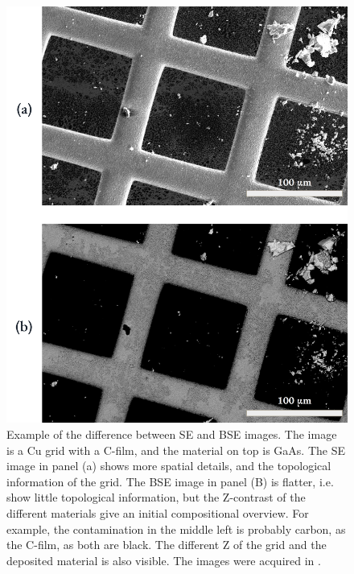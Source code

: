 




\begin{figure}[p]
    \centering
    \includegraphics[width=0.9\linewidth]{figures/SE_images/SE_vs_BSE.jpg}
    \caption{
        Example of the difference between SE and BSE images.
        The image is a Cu grid with a C-film, and the material on top is GaAs.
        The SE image in panel (a) shows more spatial details, and the topological information of the grid.
        The BSE image in panel (B) is flatter, i.e. show little topological information, but the Z-contrast of the different materials give an initial compositional overview.
        For example, the contamination in the middle left is probably carbon, as the C-film, as both are black.
        The different Z of the grid and the deposited material is also visible.
        The images were acquired in \cite{project_report}.
    }
    \label{fig:SE_vs_BSE}
\end{figure}












